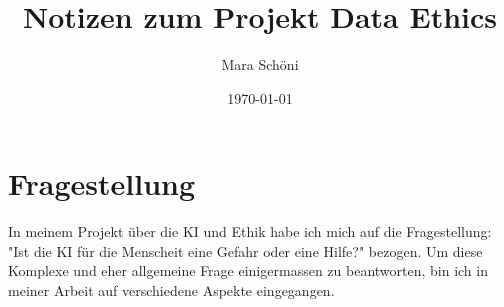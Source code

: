 \documentclass{article}
\title{Notizen zum Projekt Data Ethics}
\author{Mara Schöni}
\date{\today}
\begin{document}
\maketitle


\tableofcontents



\section{Fragestellung}

In meinem Projekt über die KI und Ethik habe ich mich auf die Fragestellung: "Ist die KI für die Menscheit eine Gefahr oder eine Hilfe?" bezogen. Um diese Komplexe und eher allgemeine Frage einigermassen zu beantworten, bin ich in meiner Arbeit auf verschiedene Aspekte eingegangen.


\printbibliography
\end{document}
